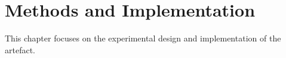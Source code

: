 \chapter{Methods and Implementation}
This chapter focuses on the experimental design and implementation of the artefact.